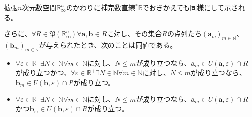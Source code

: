 \documentclass[dvipdfmx]{jsarticle}
\begin{document}
\begin{thm}
\begin{itemize}
\end{itemize}
拡張$n$次元数空間$\mathbb{R}_{\infty}^{n}$のかわりに補完数直線${}^{*}\mathbb{R}$でおきかえても同様にして示される。\par
さらに、$\forall R \in \mathfrak{P}\left( \mathbb{R}_{\infty}^{n} \right)\forall\mathbf{a},\mathbf{b} \in R$に対し、その集合$R$の点列たち$\left( \mathbf{a}_{m} \right)_{m \in \mathbb{N}}$、$\left( \mathbf{b}_{m} \right)_{m \in \mathbb{N}}$が与えられたとき、次のことは同値である。
\begin{itemize}
\item
  $\forall\varepsilon \in \mathbb{R}^{+}\exists N \in \mathbb{N}\forall m \in \mathbb{N}$に対し、$N \leq m$が成り立つなら、$\mathbf{a}_{m} \in U\left( \mathbf{a},\varepsilon \right) \cap R$が成り立つかつ、$\forall\varepsilon \in \mathbb{R}^{+}\exists N \in \mathbb{N}\forall m \in \mathbb{N}$に対し、$N \leq m$が成り立つなら、$\mathbf{b}_{m} \in U\left( \mathbf{b},\varepsilon \right) \cap R$が成り立つ。
\item
  $\forall\varepsilon \in \mathbb{R}^{+}\exists N \in \mathbb{N}\forall m \in \mathbb{N}$に対し、$N \leq m$が成り立つなら、$\mathbf{a}_{m} \in U\left( \mathbf{a},\varepsilon \right) \cap R$かつ$\mathbf{b}_{m} \in U\left( \mathbf{b},\varepsilon \right) \cap R$が成り立つ。
\end{itemize}
\end{thm}
\end{document}
